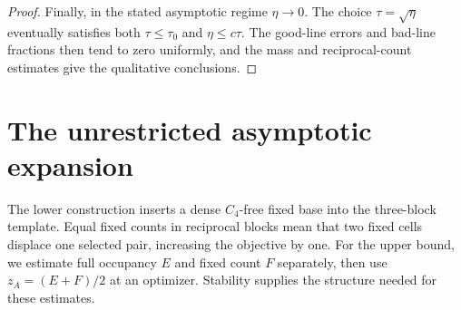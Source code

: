 \documentclass[11pt]{article}
\newcommand{\za}{z_A}
\begin{document}
\begin{proof}
Finally, in the stated asymptotic regime $\eta\to0$.
The choice $\tau=\sqrt\eta$ eventually satisfies both
$\tau\le\tau_0$ and $\eta\le c\tau$. The good-line errors and bad-line
fractions then tend to zero uniformly, and the mass and reciprocal-count
estimates give the qualitative conclusions.
\end{proof}

\section{The unrestricted asymptotic expansion}\label{sec:secondorder}
The lower construction inserts a dense $C_4$-free fixed base into the
three-block template. Equal fixed counts in reciprocal blocks mean that
two fixed cells displace one selected pair, increasing the objective by
one. For the upper bound, we estimate full occupancy $E$ and fixed count
$F$ separately, then use $\za=(E+F)/2$ at an optimizer.
Stability supplies the structure needed for these estimates.
\end{document}
